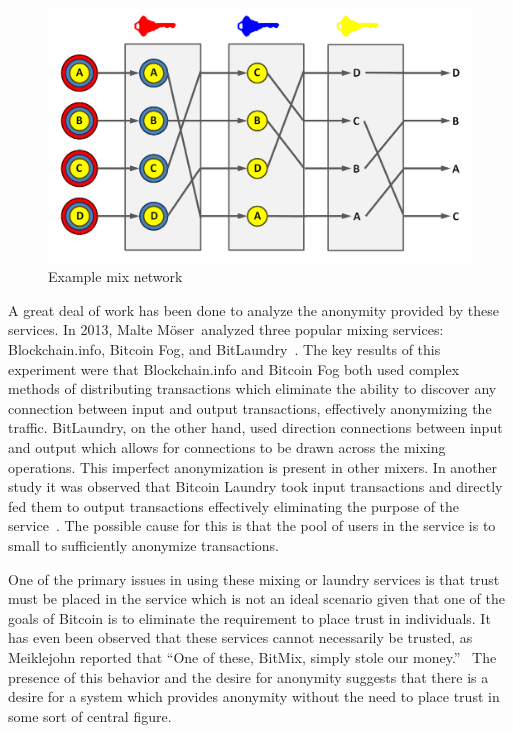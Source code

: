 \documentclass[11pt]{article}
\newcommand{\Moser}{M{\"o}ser}
\begin{document}
\begin{figure}[H]
    \caption[Example mix network]{Example mix network\protect\footnotemark}
    \centering
    \includegraphics[width=.8\linewidth]{figures/mix.png}
\end{figure}


A great deal of work has been done to analyze the anonymity provided by these services.  In 2013, Malte \Moser~analyzed
three popular mixing services: Blockchain.info, Bitcoin Fog, and BitLaundry~\cite{moser13}. The key results of this
experiment were that Blockchain.info and Bitcoin Fog both used complex methods of distributing transactions which
eliminate the ability to discover any connection between input and output transactions, effectively anonymizing the
traffic.  BitLaundry, on the other hand, used direction connections between input and output which allows for
connections to be drawn across the mixing operations.  This imperfect anonymization is present in other mixers. In
another study it was observed that Bitcoin Laundry took input transactions and directly fed them to output transactions
effectively eliminating the purpose of the service~\cite{meiklejohn13}. The possible cause for this is that the pool of
users in the service is to small to sufficiently anonymize transactions.

One of the primary issues in using these mixing or laundry services is that trust must be placed in the service which is
not an ideal scenario given that one of the goals of Bitcoin is to eliminate the requirement to place trust in
individuals. It has even been observed that these services cannot necessarily be trusted, as Meiklejohn reported that
``One of these, BitMix, simply stole our money.''~\cite{meiklejohn13} The presence of this behavior and the desire for
anonymity suggests that there is a desire for a system which provides anonymity without the need to place trust in some
sort of central figure.
\end{document}
